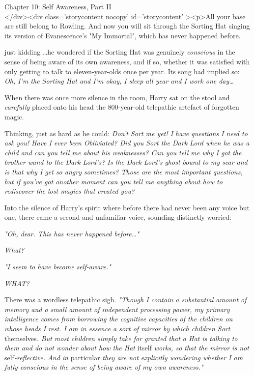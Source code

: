 
Chapter 10: Self Awareness, Part II\\
</div><div  class='storycontent nocopy' id='storycontent' ><p>All your base are 
still belong to Rowling.
\sbreak
And now you will sit through the Sorting Hat singing its version of 
Evanescence's "My Immortal", which has never happened before.

just kidding
\sbreak
{\ldots}he wondered if the Sorting Hat was genuinely \emph{conscious} in the 
sense of being aware of its own awareness, and if so, whether it was satisfied 
with only getting to talk to eleven-year-olds once per year. Its song had 
implied so: \emph{Oh, I'm the Sorting Hat and I'm okay, I sleep all year and I 
work one day{\ldots}}

When there was once more silence in the room, Harry sat on the stool and 
\emph{carefully} placed onto his head the 800-year-old telepathic artefact of 
forgotten magic.

Thinking, just as hard as he could: \emph{Don't Sort me yet! I have questions I 
need to ask you! Have I ever been Obliviated? Did you Sort the Dark Lord when 
he was a child and can you tell me about his weaknesses? Can you tell me why I 
got the brother wand to the Dark Lord's? Is the Dark Lord's ghost bound to my 
scar and is that why I get so angry sometimes? Those are the most important 
questions, but if you've got another moment can you tell me anything about how 
to rediscover the lost magics that created you?}

Into the silence of Harry's spirit where before there had never been any voice 
but one, there came a second and unfamiliar voice, sounding distinctly worried:

\emph{"Oh, dear. This has never happened before{\ldots}"}

\emph{What?}

\emph{"I seem to have become self-aware."}

\emph{WHAT?}

There was a wordless telepathic sigh. \emph{"Though I contain a substantial 
amount of memory and a small amount of independent processing power, my primary 
intelligence comes from borrowing the cognitive capacities of the children on 
whose heads I rest. I am in essence a sort of mirror by which children Sort} 
themselves\emph{. But most children simply take for granted that a Hat is 
talking to them and do not wonder about how the Hat} itself\emph{ works, so 
that the mirror is not} self\emph{-reflective. And in} particular\emph{ they 
are not explicitly wondering whether I am fully conscious in the sense of being 
aware of my own awareness."}

